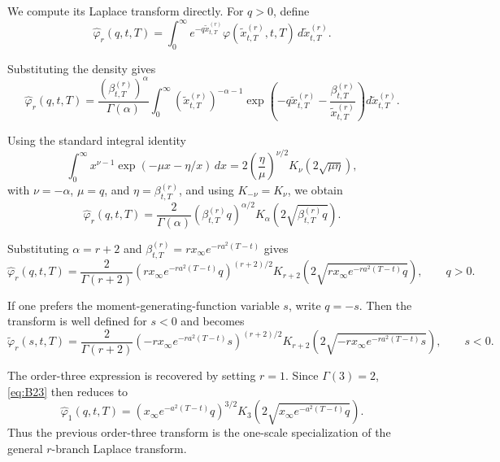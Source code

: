 \documentclass[12pt]{article}
\theoremstyle{statementstyle}
\begin{document}
\begin{appendices}
We compute its Laplace transform directly. For \(q>0\), define
\[
\widehat{\varphi}_{r}(q,t,T)
=
\int_{0}^{\infty}
 e^{-q\widetilde{x}^{(r)}_{t,T}}
 \varphi(\widetilde{x}^{(r)}_{t,T},t,T)
 \,d\widetilde{x}^{(r)}_{t,T}.
\]

Substituting the density gives
\begin{equation}
\widehat{\varphi}_{r}(q,t,T)
=
\frac{\left(\beta_{t,T}^{(r)}\right)^{\alpha}}{\Gamma(\alpha)}
\int_{0}^{\infty}
\left(\widetilde{x}^{(r)}_{t,T}\right)^{-\alpha-1}
\exp\!\left(
-q\widetilde{x}^{(r)}_{t,T}
-\frac{\beta_{t,T}^{(r)}}{\widetilde{x}^{(r)}_{t,T}}
\right)
d\widetilde{x}^{(r)}_{t,T}.
\tag{B.2.1}\label{eq:B21}
\end{equation}

Using the standard integral identity
\[
\int_{0}^{\infty}
x^{\nu-1}
\exp\!\left(-\mu x-\eta/x\right)\,dx
=
2\left(\frac{\eta}{\mu}\right)^{\nu/2}
K_{\nu}\!\left(2\sqrt{\mu\eta}\right),
\]
with \(\nu=-\alpha\), \(\mu=q\), and \(\eta=\beta_{t,T}^{(r)}\), and using
\(K_{-\nu}=K_{\nu}\), we obtain
\begin{equation}
\widehat{\varphi}_{r}(q,t,T)
=
\frac{2}{\Gamma(\alpha)}
\left(\beta_{t,T}^{(r)}q\right)^{\alpha/2}
K_{\alpha}\!\left(2\sqrt{\beta_{t,T}^{(r)}q}\right).
\tag{B.2.2}\label{eq:B22}
\end{equation}

Substituting \(\alpha=r+2\) and \(\beta_{t,T}^{(r)}=r x_{\infty}e^{-ra^{2}(T-t)}\) gives
\begin{equation}
\boxed{
\widehat{\varphi}_{r}(q,t,T)
=
\frac{2}{\Gamma(r+2)}
\left(r x_{\infty}e^{-ra^{2}(T-t)}q\right)^{(r+2)/2}
K_{r+2}\!\left(
2\sqrt{r x_{\infty}e^{-ra^{2}(T-t)}q}
\right),
\qquad q>0.
}
\tag{B.2.3}\label{eq:B23}
\end{equation}

If one prefers the moment-generating-function variable \(s\), write \(q=-s\).
Then the transform is well defined for \(s<0\) and becomes
\begin{equation}
\boxed{
\widetilde{\varphi}_{r}(s,t,T)
=
\frac{2}{\Gamma(r+2)}
\left(-r x_{\infty}e^{-ra^{2}(T-t)}s\right)^{(r+2)/2}
K_{r+2}\!\left(
2\sqrt{-r x_{\infty}e^{-ra^{2}(T-t)}s}
\right),
\qquad s<0.
}
\tag{B.2.4}\label{eq:B24}
\end{equation}

The order-three expression is recovered by setting \(r=1\). Since \(\Gamma(3)=2\),
\eqref{eq:B23} then reduces to
\[
\widehat{\varphi}_{1}(q,t,T)
=
\left(x_{\infty}e^{-a^{2}(T-t)}q\right)^{3/2}
K_{3}\!\left(2\sqrt{x_{\infty}e^{-a^{2}(T-t)}q}\right).
\]
Thus the previous order-three transform is the one-scale specialization of the general
\(r\)-branch Laplace transform.


\end{appendices}
\end{document}
